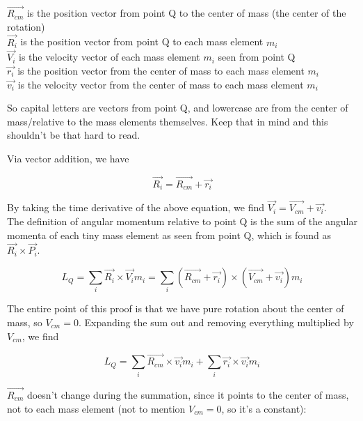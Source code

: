 $\vec{R_{cm}}$ is the position vector from point Q to the center of mass (the center of the rotation)\\
$\vec{R_i}$ is the position vector from point Q to each mass element $m_i$\\
$\vec{V_i}$ is the velocity vector of each mass element $m_i$ seen from point Q\\
$\vec{r_i}$ is the position vector from the center of mass to each mass element $m_i$\\
$\vec{v_i}$ is the velocity vector from the center of mass to each mass element $m_i$

So capital letters are vectors from point Q, and lowercase are from the center of mass/relative to the mass elements themselves. Keep that in mind and this shouldn't be that hard to read.


Via vector addition, we have

\begin{equation}
\vec{R_i} = \vec{R_{cm}} + \vec{r_i}
\end{equation}

By taking the time derivative of the above equation, we find $\vec{V_i} = \vec{V_{cm}} + \vec{v_i}$.\\
The definition of angular momentum relative to point Q is the sum of the angular momenta of each tiny mass element as seen from point Q, which is found as $\vec{R_i} \times \vec{P_i}$.

\begin{equation}
L_Q = \sum_i \vec{R_i} \times \vec{V_i} m_i = \sum_i (\vec{R_{cm}} + \vec{r_i}) \times (\vec{V_{cm}} + \vec{v_i}) m_i
\end{equation}

The entire point of this proof is that we have pure rotation about the center of mass, so $V_{cm} = 0$. Expanding the sum out and removing everything multiplied by $V_{cm}$, we find

\begin{equation}
L_Q = \sum_i \vec{R_{cm}} \times \vec{v_i} m_i + \sum_i \vec{r_i} \times \vec{v_i} m_i
\end{equation}

$\vec{R_{cm}}$ doesn't change during the summation, since it points to the center of mass, not to each mass element (not to mention $V_{cm} = 0$, so it's a constant):

